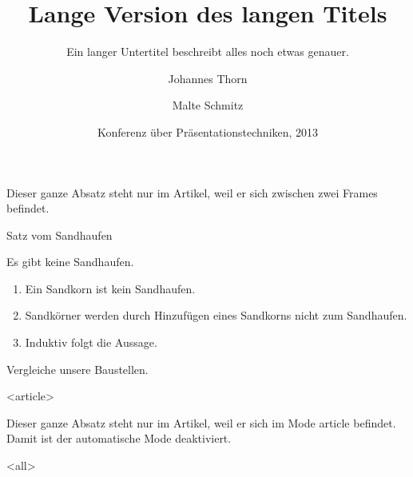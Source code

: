 \title[Kurztitel]{%
  Lange Version des langen Titels}

\subtitle{Ein langer Untertitel beschreibt
  alles noch etwas genauer.}

\author[Thorn, Schmitz]{%
  Johannes Thorn \and Malte Schmitz}

\date[KPT 2013]{Konferenz über
  Präsentationstechniken, 2013}


  \mode*

  \begin{frame}
    \maketitle
  \end{frame}

  Dieser ganze Absatz steht nur im Artikel,
  weil er sich zwischen zwei Frames befindet.

  \begin{frame}{Satz vom Sandhaufen}
    \begin{Satz}[Sandhaufensatz]
      Es gibt keine Sandhaufen.
    \end{Satz}

    \begin{Beweis}
      \begin{enumerate}
        \item Ein Sandkorn ist kein Sandhaufen.
        \item Sandkörner werden durch Hinzufügen
          eines Sandkorns nicht zum Sandhaufen.
        \item Induktiv folgt die Aussage. \qedhere
      \end{enumerate}
    \end{Beweis}

    \begin{Beispiel}
      Vergleiche unsere Baustellen.

    \end{Beispiel}
  \end{frame}

  \mode
  <article>

  Dieser ganze Absatz steht nur im Artikel,
  weil er sich im Mode article befindet.
  Damit ist der automatische Mode deaktiviert.

  \mode
  <all>
